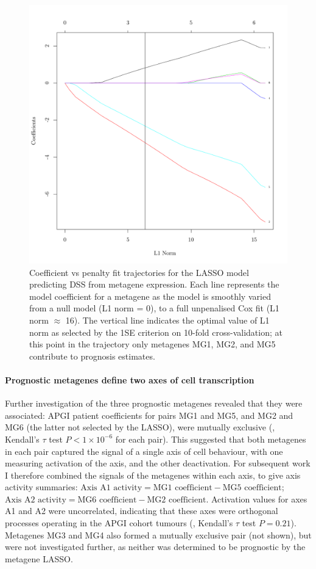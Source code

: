 \documentclass[dissertation.tex]{subfiles}
\begin{document}
\begin{figure}
\centering
\includegraphics[width=.7\linewidth]{analysis/biosurv/reports/18_SIS_diag_dsd_final/figure/nmf-metagene-glmnet-plots-2}
\caption[Fit trajectory of the \gls{LASSO} predicting \acrshort{DSS} from metagene coefficients]{Coefficient vs penalty fit trajectories for the \acrshort{LASSO} model predicting \gls{DSS} from metagene expression.  Each line represents the model coefficient for a metagene as the model is smoothly varied from a null model (L1 norm = 0), to a full unpenalised Cox fit (L1 norm $\approx$ 16).  The vertical line indicates the optimal value of L1 norm as selected by the 1SE criterion on 10-fold cross-validation; at this point in the trajectory only metagenes MG1, MG2, and MG5 contribute to prognosis estimates.}\label{fig:sigs-resub-lasso-track}
\end{figure}

\paragraph{Prognostic metagenes define two axes of cell transcription}
Further investigation of the three prognostic metagenes revealed that they were associated: \gls{APGI} patient coefficients for pairs MG1 and MG5, and MG2 and MG6 (the latter not selected by the \gls{LASSO}), were mutually exclusive (, Kendall's $\tau$ test $P < 1 \times 10^{-6}$ for each pair).  This suggested that both metagenes in each pair captured the signal of a single axis of cell behaviour, with one measuring activation of the axis, and the other deactivation.  For subsequent work I therefore combined the signals of the metagenes within each axis, to give axis activity summaries: $\text{Axis A1 activity} = \text{MG1 coefficient} - \text{MG5 coefficient}$; $\text{Axis A2 activity} = \text{MG6 coefficient} - \text{MG2 coefficient}$.  Activation values for axes A1 and A2 were uncorrelated, indicating that these axes were orthogonal processes operating in the \gls{APGI} cohort tumours (, Kendall's $\tau$ test $P = 0.21$).  Metagenes MG3 and MG4 also formed a mutually exclusive pair (not shown), but were not investigated further, as neither was determined to be prognostic by the metagene \gls{LASSO}.
\end{document}
